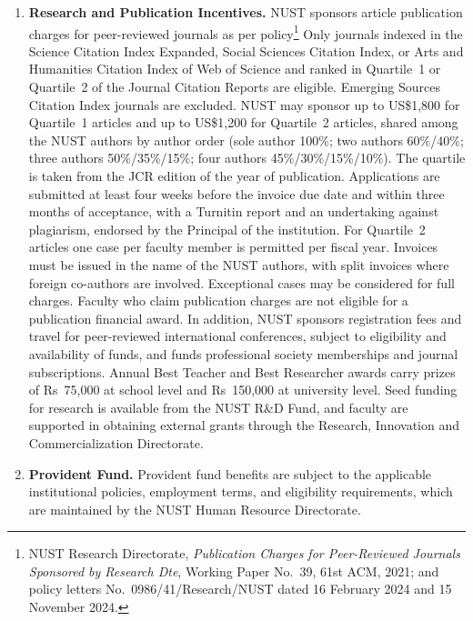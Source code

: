 \begin{enumerate}
    \item \textbf{Research and Publication Incentives.}
    NUST sponsors article publication charges for peer-reviewed journals as per policy\footnote{NUST Research Directorate, \textit{Publication Charges for
    Peer-Reviewed Journals Sponsored by Research Dte}, Working Paper
    No.~39, 61st ACM, 2021; and policy letters No.~0986/41/Research/NUST
    dated 16 February 2024 and 15 November 2024.} Only journals indexed in
    the Science Citation Index Expanded, Social Sciences Citation Index, or
    Arts and Humanities Citation Index of Web of Science and ranked in
    Quartile~1 or Quartile~2 of the Journal Citation Reports are eligible.
    Emerging Sources Citation Index journals are excluded. NUST may sponsor
    up to US\$1,800 for Quartile~1 articles and up to US\$1,200 for
    Quartile~2 articles, shared among the NUST authors by author order
    (sole author 100\%; two authors 60\%/40\%; three authors
    50\%/35\%/15\%; four authors 45\%/30\%/15\%/10\%). The quartile is taken
    from the JCR edition of the year of publication. Applications are
    submitted at least four weeks before the invoice due date and within
    three months of acceptance, with a Turnitin report and an undertaking
    against plagiarism, endorsed by the Principal of the institution. For
    Quartile~2 articles one case per faculty member is permitted per fiscal
    year. Invoices must be issued in the name of the NUST authors, with split
    invoices where foreign co-authors are involved. Exceptional cases may be
    considered for full charges. Faculty who claim publication charges are
    not eligible for a publication financial award. In addition, NUST
    sponsors registration fees and travel for peer-reviewed international
    conferences, subject to eligibility and availability of funds, and funds
    professional society memberships and journal subscriptions. Annual Best
    Teacher and Best Researcher awards carry prizes of Rs~75,000 at school
    level and Rs~150,000 at university level. Seed funding for research is
    available from the NUST R\&D Fund, and faculty are supported in obtaining
    external grants through the Research, Innovation and Commercialization
    Directorate.

    \item \textbf{Provident Fund.}
    Provident fund benefits are subject to the applicable institutional
    policies, employment terms, and eligibility requirements, which are
    maintained by the NUST Human Resource Directorate.


\end{enumerate}
